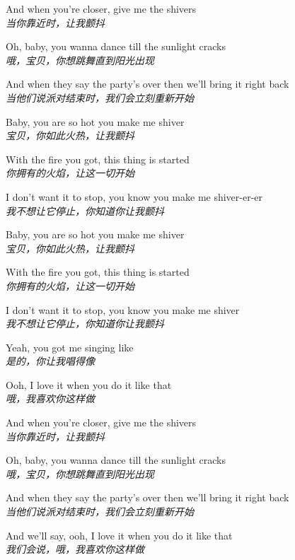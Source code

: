 \begin{spacing}{1.5}
\begin{flushleft}
And when you're closer, give me the shivers\\
\textit{当你靠近时，让我颤抖}\lyricspace

Oh, baby, you wanna dance till the sunlight cracks\\
\textit{哦，宝贝，你想跳舞直到阳光出现}\lyricspace

And when they say the party's over then we'll bring it right back\\
\textit{当他们说派对结束时，我们会立刻重新开始}\lyricspace

Baby, you are so hot you make me shiver\\
\textit{宝贝，你如此火热，让我颤抖}\lyricspace

With the fire you got, this thing is started\\
\textit{你拥有的火焰，让这一切开始}\lyricspace

I don't want it to stop, you know you make me shiver-er-er\\
\textit{我不想让它停止，你知道你让我颤抖}\lyricspace

Baby, you are so hot you make me shiver\\
\textit{宝贝，你如此火热，让我颤抖}\lyricspace

With the fire you got, this thing is started\\
\textit{你拥有的火焰，让这一切开始}\lyricspace

I don't want it to stop, you know you make me shiver\\
\textit{我不想让它停止，你知道你让我颤抖}\lyricspace

Yeah, you got me singing like\\
\textit{是的，你让我唱得像}\lyricspace

Ooh, I love it when you do it like that\\
\textit{哦，我喜欢你这样做}\lyricspace

And when you're closer, give me the shivers\\
\textit{当你靠近时，让我颤抖}\lyricspace

Oh, baby, you wanna dance till the sunlight cracks\\
\textit{哦，宝贝，你想跳舞直到阳光出现}\lyricspace

And when they say the party's over then we'll bring it right back\\
\textit{当他们说派对结束时，我们会立刻重新开始}\lyricspace

And we'll say, ooh, I love it when you do it like that\\
\textit{我们会说，哦，我喜欢你这样做}\lyricspace


\end{flushleft}
\end{spacing}

